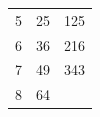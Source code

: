 {{\begin{center}
\begin{tabular}[t]{|l|l|l|}
        5 &
        25 &
        125%
     \tabularnewline\cline{1-1}\cline{2-2}\cline{3-3}
        6 &
        36 &
        216%
     \tabularnewline\cline{1-1}\cline{2-2}\cline{3-3}
        7 &
        49 &
        343%
     \tabularnewline\cline{1-1}\cline{2-2}\cline{3-3}
        8 &
        64 &

\end{tabular}
\end{center}}}
